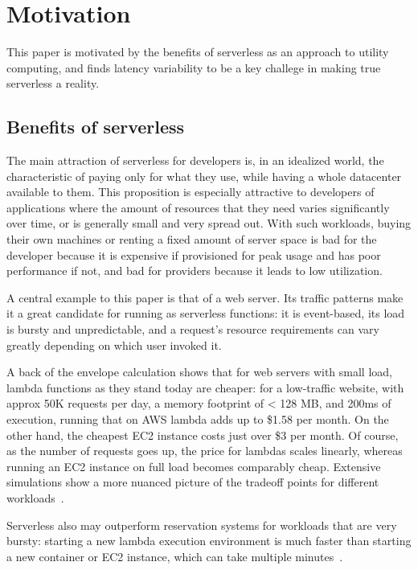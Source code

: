 \section{Motivation}\label{motivation}

This paper is motivated by the benefits of serverless as an approach to utility
computing, and finds latency variability to be a key challege in making true
serverless a reality.

\subsection{Benefits of serverless}

The main attraction of serverless for developers is, in an idealized world, the
characteristic of paying only for what they use, while having a whole datacenter
available to them. This proposition is especially attractive to developers of
applications where the amount of resources that they need varies significantly
over time, or is generally small and very spread out. With such workloads,
buying their own machines or renting a fixed amount of server space is bad for
the developer because it is expensive if provisioned for peak usage and has poor
performance if not, and bad for providers because it leads to low utilization.

A central example to this paper is that of a web server. Its traffic patterns
make it a great candidate for running as serverless functions: it is
event-based, its load is bursty and unpredictable, and a request's resource
requirements can vary greatly depending on which user invoked it.


A back of the envelope calculation shows that for web servers with small load,
lambda functions as they stand today are cheaper: for a low-traffic website,
with approx 50K requests per day, a memory footprint of < 128 MB, and 200ms of
execution, running that on AWS lambda adds up to \$1.58 per month. On the other
hand, the cheapest EC2 instance costs just over \$3 per month. Of course, as the
number of requests goes up, the price for lambdas scales linearly, whereas
running an EC2 instance on full load becomes comparably cheap. Extensive
simulations show a more nuanced picture of the tradeoff points for different
workloads~\cite{econ-of-serverless,trek10-blog}.

Serverless also may outperform reservation systems for workloads that are very
bursty: starting a new lambda execution environment is much faster than starting
a new container or EC2 instance, which can take multiple
minutes~\cite{ec2-autoscaling}.


